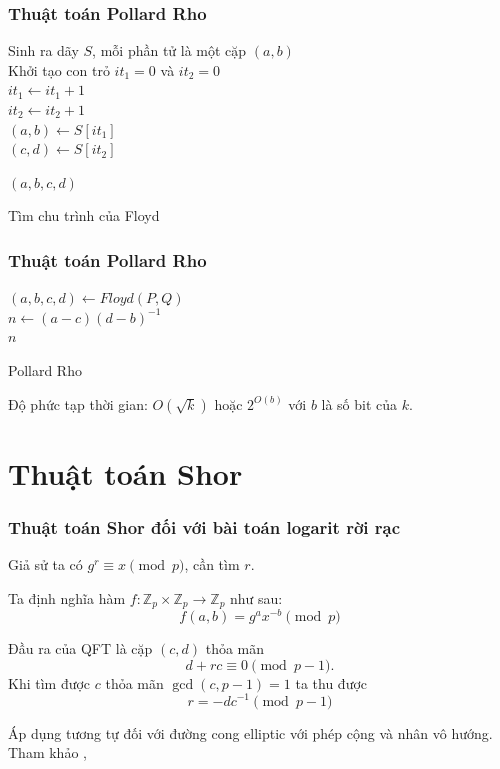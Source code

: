 \documentclass [xcolor=svgnames, t] {beamer}
\theoremstyle{definition}
\begin{document}
\begin{frame}
    \frametitle{Thuật toán Pollard Rho}

    \begin{algorithm}[H]
        \Begin
        {
            Sinh ra dãy $S$, mỗi phần tử là một cặp $(a,b)$ \\
            Khởi tạo con trỏ $it_1 = 0$ và $it_2 = 0$ \\
            {
                $it_1 \gets it_1 + 1$ \\
                $it_2 \gets it_2 + 1$ \\
                $(a,b) \gets S[it_1]$ \\
                $(c,d) \gets S[it_2]$ \\
            }

            \Return $(a,b,c,d)$
        }
        \caption{Tìm chu trình của Floyd}
    \end{algorithm}

\end{frame}
\begin{frame}
    \frametitle{Thuật toán Pollard Rho}

    \begin{algorithm}[H]
        \Begin
        {
            $(a,b,c,d) \gets Floyd(P,Q)$ \\
            $n \gets (a-c)(d-b)^{-1}$ \\

            \Return $n$
        }
        \caption{Pollard Rho}
    \end{algorithm}
    Độ phức tạp thời gian: $O(\sqrt{k})$ hoặc $2^{O(b)}$ với $b$ là số bit của $k$.
\end{frame}
\section{Thuật toán Shor}
\begin{frame}
    \frametitle{Thuật toán Shor đối với bài toán logarit rời rạc}
    Giả sử ta có $g^r \equiv x \pmod{p}$, cần tìm $r$.

    Ta định nghĩa hàm $f: \mathbb{Z}_p  \times \mathbb{Z}_p \rightarrow \mathbb{Z}_p$ như sau:
    $$ f(a,b) = g^ax^{-b} \pmod{p} $$

    Đầu ra của QFT là cặp $(c,d)$ thỏa mãn $$d+rc \equiv 0 \pmod{p-1}.$$
    Khi tìm được $c$ thỏa mãn $\gcd(c, p-1) = 1$
    ta thu được $$r = -dc^{-1} \pmod{p-1}$$

    Áp dụng tương tự đối với đường cong elliptic với phép cộng và nhân vô hướng.
    Tham khảo \cite{proos2003shor}, \cite{shor1999polynomial}
\end{frame}
\end{document}
